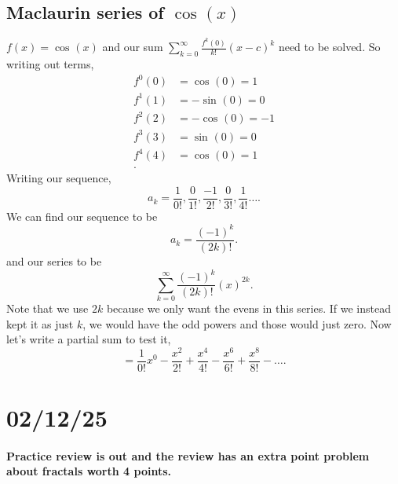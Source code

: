 \subsection*{Maclaurin series of $ \cos^{  } \left( x \right)  $}%
	 $ f\left( x \right) =\cos^{  } \left( x \right)  $ and our sum $ \sum_{ k=0 } ^{ \infty } \frac{ f^{ k }\left( 0 \right)  }{ k! }\left( x-c \right) ^{ k } $ need to be solved. So writing out terms,
	 \begin{align*}
			f^{ 0 }\left( 0 \right) &= \cos^{  } \left( 0 \right) =1 \\
			f^{ 1 }\left( 1 \right) &= -\sin^{  } \left( 0 \right) =0 \\
			f^{ 2 }\left( 2 \right) &= -\cos^{  } \left( 0 \right) =-1 \\
			f^{ 3 }\left( 3 \right) &= \sin^{  } \left( 0 \right) =0 \\
			f^{ 4 }\left( 4 \right) &= \cos^{  } \left( 0 \right) =1 \\
	 .\end{align*}
	 Writing our sequence,
	 \[
		a_k=\frac{ 1 }{ 0! } ,\frac{ 0 }{ 1! } ,\frac{ -1 }{ 2! } ,\frac{ 0 }{ 3! } ,\frac{ 1 }{ 4! }\ldots
	 .\] 
	 We can find our sequence to be 
	 \[
	 a_k=\frac{ \left( -1 \right) ^{ k } }{ \left( 2k \right) ! }
	 .\] 
	 and our series to be 
	 \[
	 \sum_{ k=0 } ^{ \infty } \frac{ \left( -1 \right) ^{ k } }{ \left( 2k \right) ! }\left( x \right) ^{ 2k }
	 .\] 
		Note that we use $ 2k $ because we only want the evens in this series. If we instead kept it as just $ k $, we would have the odd powers and those would just zero. Now let's write a partial sum to test it,
		\[
		=\frac{ 1 }{ 0! } x^{ 0 }-\frac{ x^2 }{ 2! } + \frac{ x^{ 4 } }{ 4! }-\frac{ x^{ 6 } }{ 6! } + \frac{ x^{ 8 } }{ 8! } - \ldots
		.\] 

\section*{02/12/25}%
\label{sec:02/12/25}
\paragraph{Practice review is out and the review has an extra point problem about fractals worth 4 points. }

